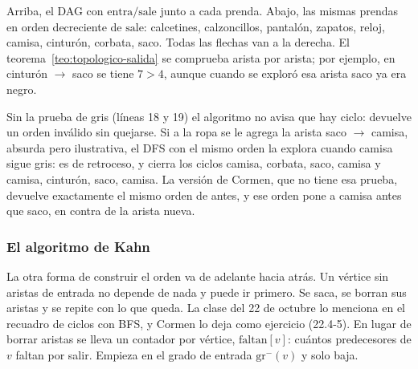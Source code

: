 \documentclass[11pt,letterpaper]{article}
\begin{document}
\begin{ejemplo}
\begin{center}
  \end{center}
  Arriba, el DAG con $\text{entra}/\text{sale}$ junto a cada prenda.
  Abajo, las mismas prendas en orden decreciente de $\text{sale}$:
  calcetines, calzoncillos, pantalón, zapatos, reloj, camisa, cinturón,
  corbata, saco. Todas las flechas van a la derecha. El
  teorema~\ref{teo:topologico-salida} se comprueba arista por arista;
  por ejemplo, en cinturón $\to$ saco se tiene $7 > 4$, aunque cuando
  se exploró esa arista saco ya era negro.
\end{ejemplo}

\begin{ojo}
  Sin la prueba de gris (líneas 18 y 19) el algoritmo no avisa que hay
  ciclo: devuelve un orden inválido sin quejarse. Si a la ropa se le
  agrega la arista saco $\to$ camisa, absurda pero ilustrativa, el DFS
  con el mismo orden la explora cuando camisa sigue gris: es de
  retroceso, y cierra los ciclos camisa, corbata, saco, camisa y
  camisa, cinturón, saco, camisa. La versión de Cormen, que no tiene
  esa prueba, devuelve exactamente el mismo orden de antes, y ese orden
  pone a camisa antes que saco, en contra de la arista nueva.
\end{ojo}

\subsubsection*{El algoritmo de Kahn}

La otra forma de construir el orden va de adelante hacia atrás. Un
vértice sin aristas de entrada no depende de nada y puede ir primero.
Se saca, se borran sus aristas y se repite con lo que queda. La clase
del 22 de octubre lo menciona en el recuadro de ciclos con BFS, y
Cormen lo deja como ejercicio (22.4-5). En lugar de borrar aristas se
lleva un contador por vértice, $\text{faltan}[v]$: cuántos predecesores
de $v$ faltan por salir. Empieza en el grado de entrada
$\text{gr}^{-}(v)$ y solo baja.
\end{document}
